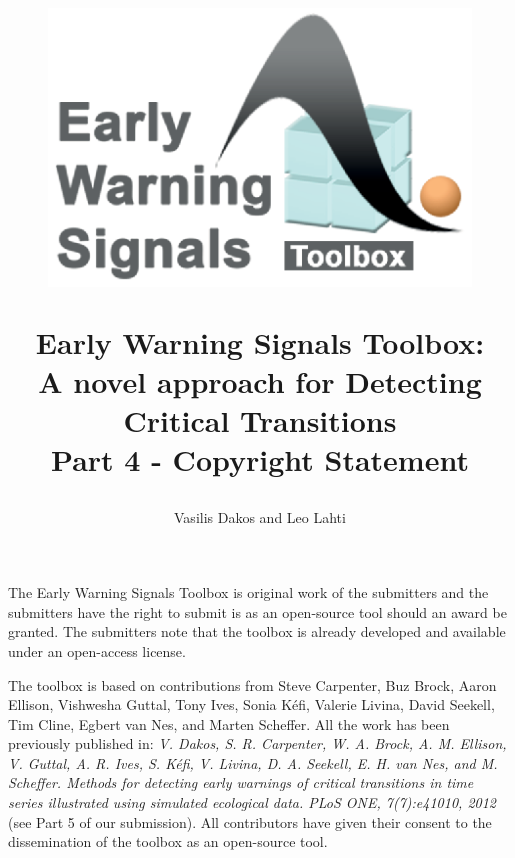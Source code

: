 \documentclass[12pt,a4paper,final]{article}
\author{Vasilis Dakos and Leo Lahti}
\title{
\begin{figure}[h]
\includegraphics[scale=0.55]{logoEWS.eps}
\end{figure}
Early Warning Signals Toolbox:\\ 
A novel approach for Detecting Critical Transitions\\
Part 4 - Copyright Statement
}
\begin{document}
\maketitle

\begin{doublespacing}

The Early Warning Signals Toolbox is original work of the submitters and the submitters have the right to submit is as an open-source tool should an award be granted. The submitters note that the toolbox is already developed and available under an open-access license.

The toolbox is based on contributions from Steve Carpenter, Buz Brock, Aaron Ellison, Vishwesha Guttal, Tony Ives, Sonia K\'{e}fi, Valerie Livina, David Seekell, Tim Cline, Egbert van Nes, and Marten Scheffer. All the work has been previously published in: \textit{V. Dakos, S. R. Carpenter, W. A. Brock, A. M. Ellison, V. Guttal, A. R. Ives, S. K\'{e}fi, V. Livina, D. A. Seekell, E. H. van Nes, and M. Scheffer. Methods for detecting early warnings of critical transitions in time series illustrated using simulated ecological data. PLoS ONE, 7(7):e41010, 2012} (see Part 5 of our submission).
All contributors have given their consent to the dissemination of the toolbox as an open-source tool.

\end{doublespacing}
\end{document}
